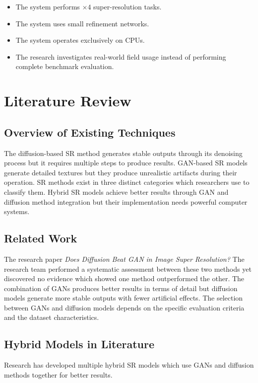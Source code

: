 \documentclass[conference]{IEEEtran}
\begin{document}
\begin{itemize}
    \item The system performs $\times4$ super-resolution tasks.
    \item The system uses small refinement networks.
    \item The system operates exclusively on CPUs.
    \item The research investigates real-world field usage instead of performing complete benchmark evaluation.
\end{itemize}

\section{Literature Review}

\subsection{Overview of Existing Techniques}
The diffusion-based SR method generates stable outputs through its denoising process but it requires multiple steps to produce results. GAN-based SR models generate detailed textures but they produce unrealistic artifacts during their operation. SR methods exist in three distinct categories which researchers use to classify them. Hybrid SR models achieve better results through GAN and diffusion method integration but their implementation needs powerful computer systems.

\subsection{Related Work}
The research paper \textit{Does Diffusion Beat GAN in Image Super Resolution?} The research team performed a systematic assessment between these two methods yet discovered no evidence which showed one method outperformed the other. The combination of GANs produces better results in terms of detail but diffusion models generate more stable outputs with fewer artificial effects. The selection between GANs and diffusion models depends on the specific evaluation criteria and the dataset characteristics.

\subsection{Hybrid Models in Literature}
Research has developed multiple hybrid SR models which use GANs and diffusion methods together for better results.
\end{document}
